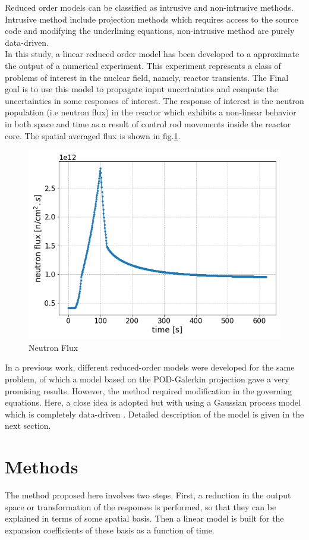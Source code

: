 \documentclass{anstrans}
\begin{document}
Reduced order models can be classified as intrusive and non-intrusive methods. Intrusive method include projection methods which requires access to the source code and modifying the underlining equations, non-intrusive method are purely data-driven.\\
In this study, a linear reduced order model has been developed to a approximate the output of a numerical experiment. This experiment represents a class of problems of interest in the nuclear field, namely, reactor transients. 
The Final goal is to use this model to propagate input uncertainties and compute the uncertainties in some responses of interest.
The response of interest is the neutron population (i.e neutron flux) in the reactor which exhibits a non-linear behavior in both space and time as a result of control rod movements inside the reactor core. The spatial averaged flux is shown in fig.\ref{fig:neutron flux}.\\
\begin{figure}
    \centering
    \includegraphics[scale=0.4]{./figs/ave_flux.png}
    \caption{Neutron Flux}
    \label{fig:neutron flux}
\end{figure}
In a previous work, different reduced-order models were developed for the same problem, of which a model based on the POD-Galerkin projection gave a very promising results. 
However, the method required modification in the governing equations.
Here, a close idea is adopted but with using a Gaussian process model which is completely data-driven . 
Detailed description of the model is given in the next section.

\section{Methods}
The method proposed here involves two steps. First, a reduction in the output space or transformation of the responses is performed, so that they can be explained in terms of some spatial basis.
Then a linear model is built for the expansion coefficients of these basis as a function of time. 
\end{document}
